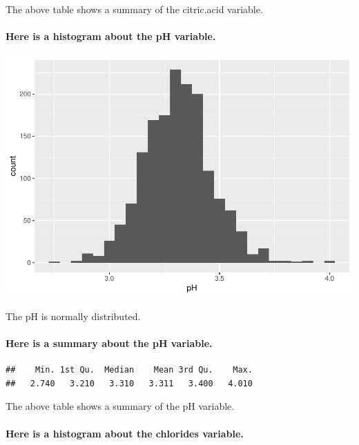 \documentclass[]{article}
\let\oldparagraph\paragraph
\renewcommand{\paragraph}[1]{\oldparagraph{#1}\mbox{}}
\begin{document}
The above table shows a summary of the citric.acid variable.

\paragraph{Here is a histogram about the pH
variable.}\label{here-is-a-histogram-about-the-ph-variable.}

\includegraphics{RedWine_files/figure-latex/Make_Plot_Function_For_pH-1.pdf}

The pH is normally distributed.

\paragraph{Here is a summary about the pH
variable.}\label{here-is-a-summary-about-the-ph-variable.}

\begin{verbatim}
##    Min. 1st Qu.  Median    Mean 3rd Qu.    Max. 
##   2.740   3.210   3.310   3.311   3.400   4.010
\end{verbatim}

The above table shows a summary of the pH variable.

\paragraph{Here is a histogram about the chlorides
variable.}\label{here-is-a-histogram-about-the-chlorides-variable.}
\end{document}
